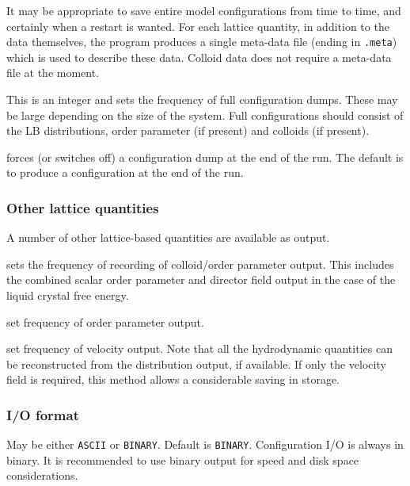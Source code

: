 It may be appropriate to save entire model configurations from
time to time, and certainly when a restart is wanted. For each lattice
quantity, in addition to the data themselves, the program produces a
single meta-data file (ending in
\texttt{.meta}) which is used to describe these data. Colloid
data does not require a meta-data file at the moment.


This is an integer and sets the frequency of full configuration dumps.
These may be large depending on the size of the system.
Full configurations should consist of the LB distributions,
order parameter (if present) and colloids (if present).



forces (or switches off) a configuration dump at the end of the run.
The default is to produce a configuration at the end of the run.

\subsubsection{Other lattice quantities}

A number of other lattice-based quantities are available as output.


sets the frequency of recording of colloid/order parameter output.
This includes the combined scalar order parameter and director
field output in the case of the liquid crystal free energy.


set frequency of order parameter output.


set frequency of velocity output. Note that all the hydrodynamic
quantities can be reconstructed from the distribution output, if
available. If only the velocity field is required, this method
allows a considerable saving in storage.


\subsubsection{I/O format}




May be either \texttt{ASCII} or \texttt{BINARY}. Default is \texttt{BINARY}.
Configuration I/O is always in binary. It is recommended to use
binary output for speed and disk space considerations.

